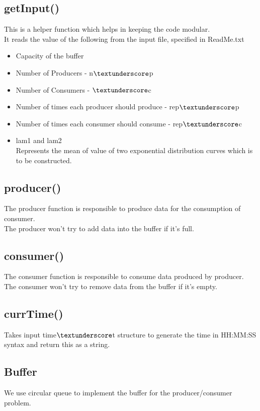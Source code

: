 \documentclass[12pt]{article}
\begin{document}
\subsection{getInput()}
This is a helper function which helps in keeping the code modular.\\
It reads the value of the following from the input file, specified in ReadMe.txt \\
\begin{itemize}
\item Capacity of the buffer
\item Number of Producers - n$\textunderscore$p\\
\item Number of Consumers - $\textunderscore$c\
\item Number of times each producer should produce - rep$\textunderscore$p\\
\item Number of times each consumer should consume - rep$\textunderscore$c\\
\item lam1 and lam2\\
Represents the mean of value of two exponential distribution curves which is to be constructed.
\end{itemize}

\subsection{producer()}
The producer function is responsible to produce data for the consumption of consumer.\\
The producer won't try to add data into the buffer if it's full.

\subsection{consumer()}
The consumer function is responsible to consume data produced by producer.\\
The consumer won't try to remove data from the buffer if it's empty.

\subsection{currTime()}
Takes input time$\textunderscore$t structure to generate the time in HH:MM:SS syntax and return this as a string.

\subsection{Buffer}
We use circular queue to implement the buffer for the producer/consumer problem.
\end{document}
